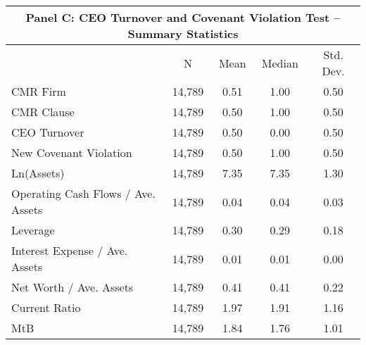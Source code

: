 {
\def\sym#1{\ifmmode^{#1}\else\(^{#1}\)\fi}
\begin{tabular}{l*{1}{cccc}}
\toprule
\multicolumn{5}{c}{\small \centering \textbf{Panel C}: CEO Turnover and Covenant Violation Test -- Summary Statistics} \\ \midrule                    &           N&        Mean&      Median&   Std. Dev.\\
\midrule
CMR Firm            &      14,789&        0.51&        1.00&        0.50\\
CMR Clause          &      14,789&        0.50&        1.00&        0.50\\
CEO Turnover        &      14,789&        0.50&        0.00&        0.50\\
New Covenant Violation&      14,789&        0.50&        1.00&        0.50\\
Ln(Assets)          &      14,789&        7.35&        7.35&        1.30\\
Operating Cash Flows / Ave. Assets&      14,789&        0.04&        0.04&        0.03\\
Leverage            &      14,789&        0.30&        0.29&        0.18\\
Interest Expense / Ave. Assets&      14,789&        0.01&        0.01&        0.00\\
Net Worth / Ave. Assets&      14,789&        0.41&        0.41&        0.22\\
Current Ratio       &      14,789&        1.97&        1.91&        1.16\\
MtB                 &      14,789&        1.84&        1.76&        1.01\\
\bottomrule
\end{tabular}
}

